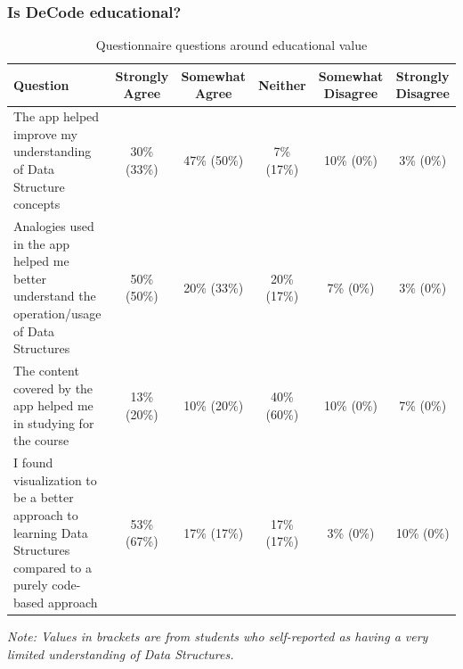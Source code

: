 \documentclass[11pt]{article}
\begin{document}
\subsubsection{Is DeCode educational?}
\begin{table}[]
  \small
  \begin{tabulary}{\linewidth}{|L|C|C|C|C|C|}
  \hline
  \textbf{Question}                                                                                                  & \textbf{Strongly Agree} & \textbf{Somewhat Agree} & \textbf{Neither} & \textbf{Somewhat Disagree} & \textbf{Strongly Disagree} \\ \hline
  The app helped improve my understanding of Data Structure concepts                                                 & 30\% (33\%)             & 47\% (50\%)             & 7\% (17\%)       & 10\% (0\%)                 & 3\% (0\%)                  \\ \hline
  Analogies used in the app helped me better understand the operation/usage of Data Structures                       & 50\% (50\%)             & 20\% (33\%)             & 20\% (17\%)      & 7\% (0\%)                  & 3\% (0\%)                  \\ \hline
  The content covered by the app helped me in studying for the course                                                & 13\% (20\%)             & 10\% (20\%)             & 40\% (60\%)      & 10\% (0\%)                 & 7\% (0\%)                  \\ \hline
  I found visualization to be a better approach to learning Data Structures compared to a purely code-based approach & 53\% (67\%)             & 17\% (17\%)             & 17\% (17\%)      & 3\% (0\%)                  & 10\% (0\%)                 \\ \hline
  \end{tabulary}
  \emph{Note: Values in brackets are from students who self-reported as having a very limited understanding of Data Structures.}
  \caption{Questionnaire questions around educational value}
  \label{tab:edutable}
\end{table}
\end{document}
